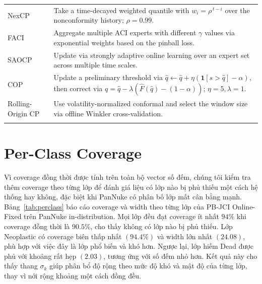 \documentclass[pdflatex,sn-mathphys-num]{sn-jnl}
\begin{document}
\begin{appendices}
\begin{table}[htbp]
\begin{tabularx}{\textwidth}{@{}lX@{}}
NexCP~\cite{barber2023conformal}
& Take a time-decayed weighted quantile with
\(w_i=\rho^{\,t-i}\) over the nonconformity history; \(\rho=0.99\). \\

FACI~\cite{gibbs2024conformal}
& Aggregate multiple ACI experts with different \(\gamma\) values via exponential
weights based on the pinball loss. \\

SAOCP~\cite{bhatnagar2023improved}
& Update via strongly adaptive online learning over an expert set across multiple
time scales. \\

COP~\cite{hu2026conformal}
& Update a preliminary threshold via
\(\hat{q}\leftarrow \hat{q}+\eta(\mathbf{1}[s>\hat{q}]-\alpha)\), then correct via
\(q=\hat{q}-\lambda(\hat{F}(\hat{q})-(1-\alpha))\); \(\eta=5,\lambda=1\). \\

Rolling-Origin CP~\cite{halkiewicz2026rolling}
& Use volatility-normalized conformal and select the window size via offline
Winkler cross-validation. \\
\botrule
\end{tabularx}
\end{table}
\section{Per-Class Coverage}\label{secA:perclass}

Vì coverage đồng thời được tính trên toàn bộ vector số đếm, chúng tôi kiểm tra thêm
coverage theo từng lớp để đánh giá liệu có lớp nào bị phủ thiếu một cách hệ thống hay
không, đặc biệt khi PanNuke có phân bố lớp mất cân bằng mạnh. Bảng~\ref{tab:perclass}
báo cáo coverage và width theo từng lớp của PB-JCI Online-Fixed trên PanNuke
in-distribution. Mọi lớp đều đạt coverage ít nhất \(94\%\) khi coverage đồng thời là
\(90.5\%\), cho thấy không có lớp nào bị phủ thiếu. Lớp Neoplastic có coverage biên
thấp nhất \((94.4\%)\) và width lớn nhất \((24.08)\), phù hợp với việc đây là lớp phổ
biến và khó hơn. Ngược lại, lớp hiếm Dead được phủ với khoảng rất hẹp \((2.03)\),
tương ứng với số đếm nhỏ hơn. Kết quả này cho thấy thang \(\sigma_k\) giúp phân bổ độ
rộng theo mức độ khó và mật độ của từng lớp, thay vì nới rộng khoảng một cách đồng đều.


\end{appendices}
\end{document}
